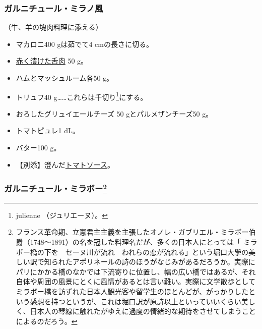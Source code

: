 \begin{recette}
{\subsubsection{ガルニチュール・ミラノ風}\label{garniture-a-la-milanaise}}



（牛、羊の塊肉料理に添える）

\begin{itemize}
\item
  マカロニ400 gは茹でて4 cmの長さに切る。
\item
  \protect\hyperlink{saumure-liquide-pour-langues}{赤く漬けた舌肉} 50
  g。
\item
  ハムとマッシュルーム各50 g。
\item
  トリュフ40 g\ldots{}\ldots{}これらは千切り\footnote{julienne
    （ジュリエーヌ）。}にする。
\item
  おろしたグリュイエールチーズ 50 gとパルメザンチーズ50 g。
\item
  トマトピュレ1 dL。
\item
  バター100 g。
\item
  【別添】澄んだ\protect\hyperlink{sauce-tomate}{トマトソース}。
\end{itemize}

\atoaki{}

\hypertarget{garniture-mirabeau}{%
\subsubsection[ガルニチュール・ミラボー]{\texorpdfstring{ガルニチュール・ミラボー\footnote{フランス革命期、立憲君主主義を主張したオノレ・ガブリエル・ミラボー伯爵（1748〜1891）の名を冠した料理名だが、多くの日本人にとっては「
  ミラボー橋の下を　セーヌ川が流れ　われらの恋が流れる」という堀口大學の美しい訳で知られたアポリネールの詩のほうがなじみがあるだろうか。実際にパリにかかる橋のなかでは下流寄りに位置し、幅の広い橋ではあるが、それ自体や周囲の風景にとくに風情があるとは言い難い。実際に文学散歩としてミラボー橋を訪ずれた日本人観光客や留学生のほとんどが、がっかりしたという感想を持つというが、これは堀口訳が原詩以上といっていいくらい美しく、日本人の琴線に触れたがゆえに過度の情緒的な期待をさせてしまうことによるのだろう。}}{ガルニチュール・ミラボー}}\label{garniture-mirabeau}}


\end{recette}
